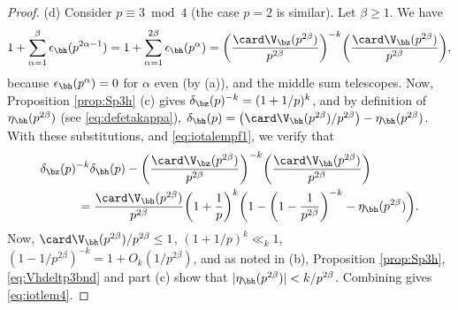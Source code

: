 \documentclass[12pt, reqno, twoside, letterpaper]{amsart}
\begin{document}
\begin{proof}
(d)
%
Consider $p \equiv 3 \bmod 4$ (the case $p = 2$ is similar).
%
Let $\beta \ge 1$.
%
We have
\[
 1 + \sum_{\alpha = 1}^{\beta} \epsilon_{\bh}(p^{2\alpha - 1})
  =
   1 + \sum_{\alpha = 1}^{2\beta} \epsilon_{\bh}(p^{\alpha})
  =
    \bigg(\frac{\card \V_{\bz}(p^{2\beta})}{p^{2\beta}}\bigg)^{-k}
     \bigg(\frac{\card \V_{\bh}(p^{2\beta})}{p^{2\beta}}\bigg),
\]
because $\epsilon_{\bh}(p^{\alpha}) = 0$ for $\alpha$ even (by 
(a)), and the middle sum telescopes.
%
Now, Proposition \ref{prop:Sp3h} (c) gives
$\delta_{\bz}(p)^{-k} = (1 + 1/p)^k$, and by definition of 
$\eta_{\bh}(p^{2\beta})$ (see \eqref{eq:defetakappa}), 
$
 \delta_{\bh}(p) 
  =
   \big(\card \V_{\bh}(p^{2\beta})/p^{2\beta}\big) - \eta_{\bh}(p^{2\beta})
$.
%
With these substitutions, and \eqref{eq:iotalempf1}, we verify 
that  
\begin{align*}
 &   
  \delta_{\bz}(p)^{-k}\delta_{\bh}(p) 
 - 
    \bigg(\frac{\card \V_{\bz}(p^{2\beta})}{p^{2\beta}}\bigg)^{-k}
     \bigg(\frac{\card \V_{\bh}(p^{2\beta})}{p^{2\beta}}\bigg)
  \\
 & \hspace{30pt}
  =   
    \frac{\card \V_{\bh}(p^{2\beta})}{p^{2\beta}}
     \bigg(1 + \frac{1}{p}\bigg)^{k}
      \bigg(1 - \bigg(1 - \frac{1}{p^{2\beta}}\bigg)^{-k} - \eta_{\bh}(p^{2\beta})\bigg).
\end{align*}
% 
Now, $\card \V_{\bh}(p^{2\beta})/p^{2\beta} \le 1$, 
$(1 + 1/p)^{k} \ll_k 1$, 
$(1 - 1/p^{2\beta})^{-k} = 1 + O_k(1/p^{2\beta})$, and as noted in 
(b), Proposition \ref{prop:Sp3h}, \eqref{eq:Vhdeltp3bnd} and 
part (c) show that $|\eta_{\bh}(p^{2\beta})| < k/p^{2\beta}$.
%
Combining gives \eqref{eq:iotlem4}.
\end{proof}
\end{document}
